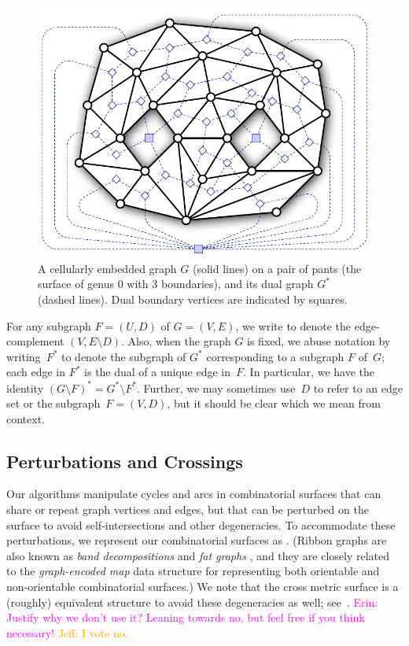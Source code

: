 \documentclass[letterpaper,review]{siamart190516}
\def\jnote#1{\textcolor{orange}{Jeff: #1}}
\def\enote#1{\textcolor{magenta}{Erin: #1}}
\begin{document}
\begin{figure}[htb]
\centering
\includegraphics[scale=0.45]{Fig/pants}
\caption{A cellularly embedded graph $G$ (solid lines) on a pair of pants (the surface of genus 0 with 3 boundaries), and its dual graph $G^*$ (dashed lines).  Dual boundary vertices are indicated by squares.}
\label{fig:duality}
\end{figure}
 
For any subgraph $F = (U,D)$ of $G = (V,E)$, we write  to denote the edge-complement $(V, {E\setminus D})$.  Also, when the graph $G$ is fixed, we abuse notation by writing~$F^*$ to denote the subgraph of $G^*$ corresponding to a subgraph $F$ of~$G$; each edge in $F^*$ is the dual of a unique edge in~$F$.  In particular, we have the identity $(G\setminus F)^* = G^* \setminus F^*$.
Further, we may sometimes use~$D$ to refer to an edge set or the subgraph~$F = (V, D)$,
but it should be clear which we mean from context.

\subsection{Perturbations and Crossings}
\label{SS:perturb}

Our algorithms manipulate cycles and arcs in combinatorial surfaces that can share or repeat graph vertices and edges, but that can be perturbed on the surface to avoid self-intersections and other degeneracies.  To accommodate these perturbations, we represent our combinatorial surfaces as  \cite{l-gos-2004,em-gos-13}.  (Ribbon graphs are also known as \emph{band decompositions}  \cite{em-gos-13} and \emph{fat graphs} \cite{l-gos-2004}, and they are closely related to the \emph{graph-encoded map} data structure \cite{l-gem-82} for representing both orientable and non-orientable combinatorial surfaces.)  We note that the cross metric surface is a (roughly) equivalent structure to avoid these degeneracies as well; see~\cite{ce-tspcs-06,cl-opdsh-07}. \enote{Justify why we don't use it? Leaning towards no, but feel free if you think necessary!} \jnote{I vote no.}
\end{document}
